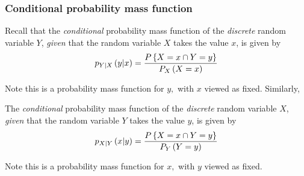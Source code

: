 \documentclass[notes=show,handout]{beamer}
\renewcommand{\Pr}{P}
\begin{document}
\begin{frame}%

\frametitle{Conditional probability mass function}

Recall that the \emph{conditional} probability mass function of the \emph{discrete 
}random variable $Y$, \emph{given} that the random variable $X$ takes the
value $x$, is given by%
\begin{equation*}
p_{Y|X}\left( y|x\right) =\frac{\Pr \left\{ X=x\cap Y=y\right\} }{%
P_{X}\left( X=x\right) }
\end{equation*}

Note this is a probability mass function for $y,$ with $x$ viewed as
fixed. Similarly, 

\begin{definition}
The \emph{conditional} probability mass function of the 
\emph{discrete }random variable $X$, \emph{given} that the random variable $%
Y $ takes the value $y$, is given by%
\begin{equation*}
p_{X|Y}\left( x|y\right) =\frac{\Pr \left\{ X=x\cap Y=y\right\} }{%
P_{Y}\left( Y=y\right) }
\end{equation*}
\end{definition}

Note this is a probability mass function for $x,$ with $y$ viewed as
fixed.

\end{frame}%
\end{document}
